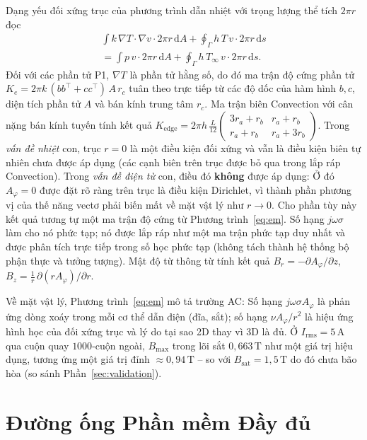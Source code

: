 \documentclass[a4paper, 10pt, conference]{ieeeconf}
\theoremstyle{remark}
\begin{document}
Dạng yếu đối xứng trục của phương trình dẫn nhiệt với trọng lượng thể tích
$2\pi r$ đọc
\begin{multline*}
  \int k\,\nabla T\!\cdot\!\nabla v \cdot 2\pi r \,\mathrm dA
  + \oint_\Gamma h\,T\,v\cdot 2\pi r\,\mathrm ds \\
  = \int p\,v\cdot 2\pi r\,\mathrm dA
  + \oint_\Gamma h\,T_\infty\,v\cdot 2\pi r\,\mathrm ds .
\end{multline*}
Đối với các phần tử P1, $\nabla T$ là phần tử hằng số, do đó ma trận độ cứng
phần tử $K_e = 2\pi k\,(bb^\top+cc^\top)\,A\,r_c$ tuân theo trực tiếp từ các
độ dốc của hàm hình $b,c$, diện tích phần tử $A$ và bán kính trung tâm $r_c$.
Ma trận biên Convection với cân nặng bán kính tuyến tính kết quả
$K_{\mathrm{edge}} = 2\pi h\,\tfrac{L}{12}
\left(\begin{smallmatrix} 3r_a+r_b & r_a+r_b \\ r_a+r_b & r_a+3r_b\end{smallmatrix}\right)$.
Trong \emph{vấn đề nhiệt} con, trục $r=0$ là một điều kiện đối xứng và vẫn là
điều kiện biên tự nhiên chưa được áp dụng (các cạnh biên trên trục được bỏ qua
trong lắp ráp Convection). Trong \emph{vấn đề điện từ} con, điều đó \textbf{không}
được áp dụng: Ở đó $A_\varphi=0$ được đặt rõ ràng trên trục là điều kiện Dirichlet,
vì thành phần phương vị của thế năng vectơ phải biến mất về mặt vật lý như $r\to0$.
Cho phần tùy này kết quả tương tự một ma trận độ cứng từ Phương trình~\eqref{eq:em}.
Số hạng $j\omega\sigma$ làm cho nó phức tạp; nó được lắp ráp như một ma trận
phức tạp duy nhất và được phân tích trực tiếp trong số học phức tạp (không tách
thành hệ thống bộ phận thực và tưởng tượng). Mật độ từ thông từ tính kết quả
$B_r=-\partial A_\varphi/\partial z$, $B_z=\tfrac1r\,\partial(rA_\varphi)/\partial r$.

Về mặt vật lý, Phương trình~\eqref{eq:em} mô tả trường AC: Số hạng $j\omega\sigma
A_\varphi$ là phản ứng dòng xoáy trong mỗi cơ thể dẫn điện (đĩa, sắt); số hạng
$\nu A_\varphi/r^2$ là hiệu ứng hình học của đối xứng trục và lý do tại sao 2D
thay vì 3D là đủ. Ở $I_{\mathrm{rms}}=5\,\mathrm A$ qua cuộn quay $1000$-cuộn
ngoài, $B_{\max}$ trong lõi sắt $0{,}663\,\mathrm T$ như một giá trị hiệu dụng,
tương ứng một giá trị đỉnh $\approx0{,}94\,\mathrm T$ -- so với $B_{\mathrm{sat}}=1{,}5\,\mathrm T$
do đó chưa bão hòa (so sánh Phần~\ref{sec:validation}).

\section{Đường ống Phần mềm Đầy đủ}
\label{app:software}
\end{document}
